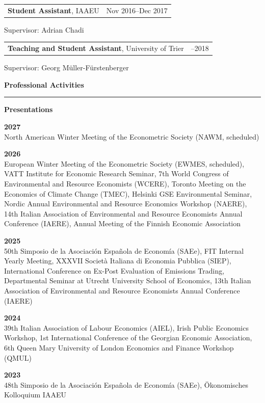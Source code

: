 \documentclass[10pt]{article}
\makeatletter
\newcommand{\cvsection}[1]{%
    \vspace{0.95em}
    {\large\bfseries #1}\par
    \vspace{0.10em}
    \hrule
    \vspace{0.55em}
}
\newcommand{\datedentry}[3]{%
    \begin{tabularx}{\textwidth}{@{}X>{\raggedleft\arraybackslash}p{3.1cm}@{}}
        #1 & #2
    \end{tabularx}
    #3
}
\makeatother
\begin{document}
\vspace{0.55em}
\datedentry{\textbf{Student Assistant}, IAAEU}{Nov 2016--Dec 2017}{%
    Supervisor: Adrian Chadi
}

\vspace{0.55em}
\datedentry{\textbf{Teaching and Student Assistant}, University of Trier}{2016--2018}{%
    Supervisor: Georg Müller-Fürstenberger
}

\cvsection{Professional Activities}

\textbf{Presentations}

\vspace{0.20em}
\textbf{2027}\\ North American Winter Meeting of the Econometric Society (NAWM, scheduled)

\vspace{0.30em}
\textbf{2026}\\ European Winter Meeting of the Econometric Society (EWMES, scheduled), VATT Institute for Economic Research Seminar, 7th World Congress of Environmental and Resource Economists (WCERE), Toronto Meeting on the Economics of Climate Change (TMEC), Helsinki GSE Environmental Seminar, Nordic Annual Environmental and Resource Economics Workshop (NAERE), 14th Italian Association of Environmental and Resource Economists Annual Conference (IAERE), Annual Meeting of the Finnish Economic Association

\vspace{0.30em}
\textbf{2025} \\ 50th Simposio de la Asociación Española de Economía (SAEe), FIT Internal Yearly Meeting, XXXVII Società Italiana di Economia Pubblica (SIEP), International Conference on Ex-Post Evaluation of Emissions Trading, Departmental Seminar at Utrecht University School of Economics, 13th Italian Association of Environmental and Resource Economists Annual Conference (IAERE)

\vspace{0.30em}
\textbf{2024}\\ 39th Italian Association of Labour Economics (AIEL), Irish Public Economics Workshop, 1st International Conference of the Georgian Economic Association, 6th Queen Mary University of London Economics and Finance Workshop (QMUL)

\vspace{0.30em}
\textbf{2023}\\ 48th Simposio de la Asociación Española de Economía (SAEe), Ökonomisches Kolloquium IAAEU

\vspace{0.50em}
\end{document}
